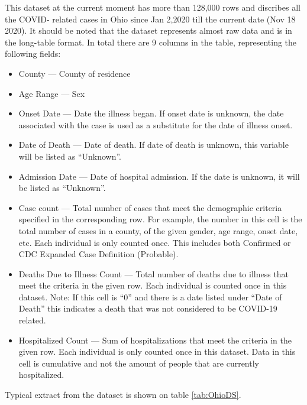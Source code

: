 \documentclass[conference]{IEEEtran}
\begin{document}
	This dataset at the current moment has more
        than 128,000 rows and discribes all the COVID- related cases in Ohio since Jan 2,2020 till the current date (Nov 18 2020). It should be noted that the dataset represents almost raw data and is in the long-table format. In total there are 9 columns in the table, representing the following fields:
        \begin{itemize}
        \item County --- County of residence
        \item Age Range --- Sex
        \item Onset Date --- Date the illness began. If onset date is unknown, the date associated with the case is used as a substitute for the date of illness onset.
        \item Date of Death --- Date of death. If date of death is unknown, this variable will be listed as “Unknown”.
        \item Admission Date --- Date of hospital admission. If the date is unknown, it will be listed as “Unknown”.
        \item Case count --- Total number of cases that meet the demographic criteria specified in the corresponding row. For example, the number in this cell is the total number of cases in a county, of the given gender, age range, onset date, etc. Each individual is only counted once. This includes both Confirmed or CDC Expanded Case Definition (Probable).
        \item Deaths Due to Illness Count --- Total number of deaths due to illness that meet the criteria in the given row. Each individual is counted once in this dataset. Note: If this cell is “0” and there is a date listed under “Date of Death” this indicates a death that was not considered to be COVID-19 related.
        \item Hospitalized Count --- Sum of hospitalizations that meet the criteria in the given row. Each individual is only counted once in this dataset. Data in this cell is cumulative and not the amount of people that are currently hospitalized.
        \end{itemize}
Typical extract from the dataset is shown on table \ref{tab:OhioDS}.
\end{document}
